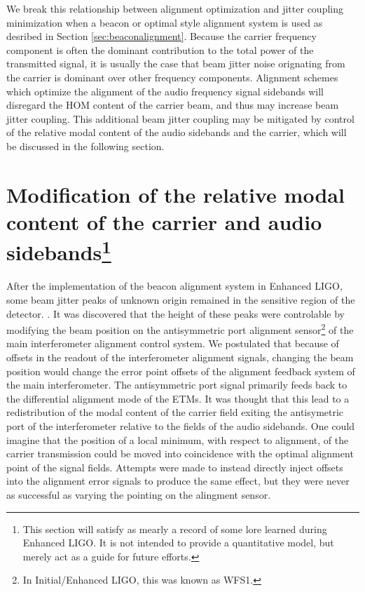 
We break this relationship between alignment optimization and jitter coupling minimization when a beacon or optimal style alignment system is used as desribed in Section \ref{sec:beaconalignment}. %
Because the carrier frequency component is often the dominant contribution to the total power of the transmitted signal, it is usually the case that beam jitter noise orignating from the carrier is dominant over other frequency components. %
Alignment schemes which optimize the alignment of the audio frequency signal sidebands will disregard the HOM content of the carrier beam, and thus may increase beam jitter coupling. %
This additional beam jitter coupling may be mitigated by control of the relative modal content of the audio sidebands and the carrier, which will be discussed in the following section.

\section[Modification of the relative modal content of the carrier and audio sidebands]{Modification of the relative modal content of the carrier and audio sidebands\footnote{This section will satisfy as mearly a record of some lore learned during Enhanced LIGO. It is not intended to provide a quantitative model, but merely act as a guide for future efforts.}}

After the implementation of the beacon alignment system in Enhanced LIGO, some beam jitter peaks of unknown origin remained in the sensitive region of the detector. %
. %
It was discovered that the height of these peaks were controlable by modifying the beam position on the antisymmetric port alignment sensor\footnote{In Initial/Enhanced LIGO, this was known as WFS1.} of the main interferometer alignment control system. %
We postulated that because of offsets in the readout of the interferometer alignment signals, changing the beam position would change the error point offsets of the alignment feedback system of the main interferometer. %
The antisymmetric port signal primarily feeds back to the differential alignment mode of the ETMs. %
It was thought that this lead to a redistribution of the modal content of the carrier field exiting the antisymetric port of the interferometer relative to the fields of the audio sidebands. %
One could imagine that the position of a local minimum, with respect to alignment, of the carrier transmission could be moved into coincidence with the optimal alignment point of the signal fields. %
Attempts were made to instead directly inject offsets into the alignment error signals to produce the same effect, but they were never as successful as varying the pointing on the alingment sensor.
